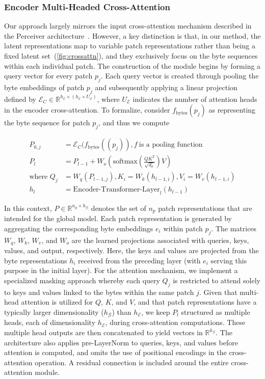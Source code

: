\subsubsection{Encoder Multi-Headed Cross-Attention}
\label{sec:enc-cross-attn}
Our approach largely mirrors the input cross-attention mechanism described in the Perceiver architecture~\citep{jaegle2021perceiver}. However, a key distinction is that, in our method, the latent representations map to variable patch representations rather than being a fixed latent set~(\autoref{fig:crossattn}), and they exclusively focus on the byte sequences within each individual patch. The construction of the module begins by forming a query vector for every patch $p_j$. Each query vector is created through pooling the byte embeddings of patch $p_j$ and subsequently applying a linear projection defined by $\mathcal{E}_{C} \in \mathbb{R}^{h_{\mathcal{E}} \times (h_{\mathcal{E}} \times U_{\mathcal{E}})}$, where $U_{\mathcal{E}}$ indicates the number of attention heads in the encoder cross-attention. To formalize, consider $f_{\text{bytes}}(p_j)$ as representing the byte sequence for patch $p_j$, and thus we compute

\begin{align}
P_{0,j} &= \mathcal{E}_{C}(f_\text{bytes}((p_j)), f~ \text{is a pooling function} \\
P_l &= P_{l-1} + W_o\left(\text{softmax}\left(\frac{QK^T}{\sqrt{d_k}}\right)V\right) \\
\text{where } Q_j &= W_q(P_{l-1,j}), K_i = W_k(h_{l-1,i}), V_i = W_v(h_{l-1,i}) \\
h_l &= \text{Encoder-Transformer-Layer}_l(h_{l-1})
\end{align}

In this context, $P \in \mathbb{R}^{n_p \times h_{\mathcal{G}}}$ denotes the set of $n_p$ patch representations that are intended for the global model. Each patch representation is generated by aggregating the corresponding byte embeddings $e_i$ within patch $p_j$. The matrices $W_q$, $W_k$, $W_v$, and $W_o$ are the learned projections associated with queries, keys, values, and output, respectively. Here, the keys and values are projected from the byte representations $h_i$ received from the preceding layer (with $e_i$ serving this purpose in the initial layer). For the attention mechanism, we implement a specialized masking approach whereby each query $Q_j$ is restricted to attend solely to keys and values linked to the bytes within the same patch $j$. Given that multi-head attention is utilized for $Q$, $K$, and $V$, and that patch representations have a typically larger dimensionality ($h_{\mathcal{G}}$) than $h_{\mathcal{E}}$, we keep $P_l$ structured as multiple heads, each of dimensionality $h_{\mathcal{E}}$, during cross-attention computations. These multiple head outputs are then concatenated to yield vectors in $\mathbb{R}^{h_{\mathcal{G}}}$. The architecture also applies pre-LayerNorm to queries, keys, and values before attention is computed, and omits the use of positional encodings in the cross-attention operation. A residual connection is included around the entire cross-attention module.

